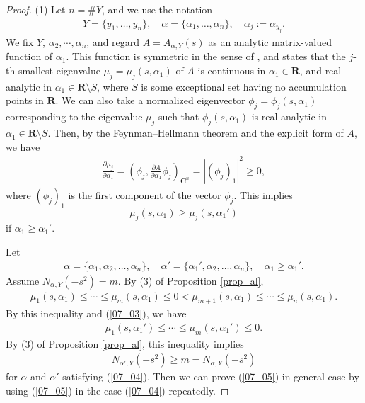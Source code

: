 \documentclass[12pt,a4paper]{article}
\begin{document}
\begin{proof}
 (1) Let $n=\#Y$, and we use the notation
\begin{align*}
 Y =\{y_1,\ldots,y_n\},\quad
\alpha=\{\alpha_1,\ldots,\alpha_n\},\quad \alpha_j:=\alpha_{y_j}.
\end{align*}
We fix $Y$, $\alpha_2,\cdots,\alpha_n$, 
and regard $A=A_{\alpha,Y}(s)$ as an analytic matrix-valued function 
of $\alpha_1$.
This function is symmetric in the sense of
\cite[section II-6.1]{Ka},
and 
\cite[II-Theorem 6.1]{Ka} states that
the $j$-th smallest eigenvalue $\mu_j=\mu_j(s,\alpha_1)$ of $A$
is continuous in $\alpha_1 \in \mathbf{R}$,
and real-analytic in $\alpha_1 \in \mathbf{R}\setminus S$,
where $S$ is some exceptional set having no accumulation points in $\mathbf{R}$.
We can also take 
a normalized eigenvector $\phi_j=\phi_j(s,\alpha_1)$
corresponding to the eigenvalue $\mu_j$
such that $\phi_j(s,\alpha_1)$ is real-analytic in $\alpha_1\in \mathbf{R}\setminus S$.
Then, by the Feynman--Hellmann theorem and the explicit form of $A$,
we have
\begin{align*}
 \frac{\partial \mu_j}{\partial \alpha_1}
=
\left(\phi_j, \frac{\partial A}{\partial \alpha_1}\phi_j\right)_{\mathbf{C}^n}
=
|(\phi_j)_1|^2\geq 0,
\end{align*}
where $(\phi_j)_1$ is the first component of the vector $\phi_j$.
This implies
\begin{equation}
\label{07_03}
 \mu_j(s,\alpha_1)\geq  \mu_j(s,\alpha_1')
\end{equation}
if $\alpha_1\geq \alpha_1'$.

Let 
\begin{align}
\label{07_04}
\alpha=\{\alpha_1,\alpha_2,\ldots,\alpha_n\},\quad
\alpha'=\{\alpha_1',\alpha_2,\ldots,\alpha_n\},\quad
\alpha_1\geq \alpha_1'.
\end{align}
Assume $N_{\alpha,Y}(-s^2)=m$. 
By (3) of Proposition \ref{prop_al},
\begin{align*}
  \mu_1(s,\alpha_1) \leq \cdots \leq \mu_m(s,\alpha_1) \leq 0 
< \mu_{m+1}(s,\alpha_1)\leq \cdots \leq \mu_n(s,\alpha_1).
\end{align*}
By this inequality and (\ref{07_03}), we have
\begin{align*}
  \mu_1(s,\alpha_1') \leq \cdots \leq \mu_m(s,\alpha_1') \leq 0.
\end{align*}
By (3) of Proposition \ref{prop_al}, this inequality implies
\begin{align}
\label{07_05}
 N_{\alpha', Y}(-s^2)\geq m =  N_{\alpha, Y}(-s^2)
\end{align}
for $\alpha$ and $\alpha'$ satisfying (\ref{07_04}).
Then we can prove (\ref{07_05}) in general case
by using (\ref{07_05}) in the case (\ref{07_04}) repeatedly.


\end{proof}
\end{document}
